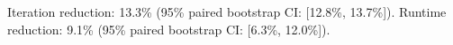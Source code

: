 Iteration reduction: 13.3\% (95\% paired bootstrap CI: [12.8\%, 13.7\%]).
Runtime reduction: 9.1\% (95\% paired bootstrap CI: [6.3\%, 12.0\%]).
